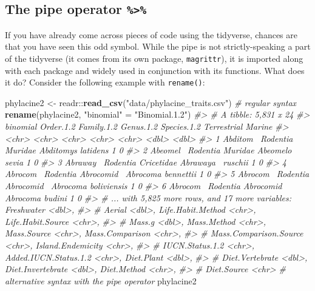 \documentclass[]{book}
\newenvironment{Shaded}{}{}
\newcommand{\CommentTok}[1]{\textcolor[rgb]{0.38,0.63,0.69}{\textit{#1}}}
\newcommand{\KeywordTok}[1]{\textcolor[rgb]{0.00,0.44,0.13}{\textbf{#1}}}
\newcommand{\NormalTok}[1]{#1}
\newcommand{\OperatorTok}[1]{\textcolor[rgb]{0.40,0.40,0.40}{#1}}
\newcommand{\StringTok}[1]{\textcolor[rgb]{0.25,0.44,0.63}{#1}}
\begin{document}
\hypertarget{the-pipe-operator}{%
\subsection{\texorpdfstring{The pipe operator \texttt{\%\textgreater{}\%}}{The pipe operator \%\textgreater{}\%}}\label{the-pipe-operator}}

If you have already come across pieces of code using the tidyverse, chances are
that you have seen this odd symbol. While the pipe is not strictly-speaking a
part of the tidyverse (it comes from its own package, \texttt{magrittr}), it is
imported along with each package and widely used in conjunction with its
functions.
What does it do? Consider the following example with \texttt{rename()}:

\begin{Shaded}
\begin{Highlighting}[]
\NormalTok{phylacine2 <-}\StringTok{ }\NormalTok{readr}\OperatorTok{::}\KeywordTok{read_csv}\NormalTok{(}\StringTok{"data/phylacine_traits.csv"}\NormalTok{)}
\CommentTok{# regular syntax}
\KeywordTok{rename}\NormalTok{(phylacine2, }\StringTok{"binomial"}\NormalTok{ =}\StringTok{ "Binomial.1.2"}\NormalTok{)}
\CommentTok{#> # A tibble: 5,831 x 24}
\CommentTok{#>   binomial Order.1.2 Family.1.2 Genus.1.2 Species.1.2 Terrestrial Marine}
\CommentTok{#>   <chr>    <chr>     <chr>      <chr>     <chr>             <dbl>  <dbl>}
\CommentTok{#> 1 Abditom~ Rodentia  Muridae    Abditomys latidens              1      0}
\CommentTok{#> 2 Abeomel~ Rodentia  Muridae    Abeomelo~ sevia                 1      0}
\CommentTok{#> 3 Abraway~ Rodentia  Cricetidae Abrawaya~ ruschii               1      0}
\CommentTok{#> 4 Abrocom~ Rodentia  Abrocomid~ Abrocoma  bennettii             1      0}
\CommentTok{#> 5 Abrocom~ Rodentia  Abrocomid~ Abrocoma  boliviensis           1      0}
\CommentTok{#> 6 Abrocom~ Rodentia  Abrocomid~ Abrocoma  budini                1      0}
\CommentTok{#> # ... with 5,825 more rows, and 17 more variables: Freshwater <dbl>,}
\CommentTok{#> #   Aerial <dbl>, Life.Habit.Method <chr>, Life.Habit.Source <chr>,}
\CommentTok{#> #   Mass.g <dbl>, Mass.Method <chr>, Mass.Source <chr>, Mass.Comparison <chr>,}
\CommentTok{#> #   Mass.Comparison.Source <chr>, Island.Endemicity <chr>,}
\CommentTok{#> #   IUCN.Status.1.2 <chr>, Added.IUCN.Status.1.2 <chr>, Diet.Plant <dbl>,}
\CommentTok{#> #   Diet.Vertebrate <dbl>, Diet.Invertebrate <dbl>, Diet.Method <chr>,}
\CommentTok{#> #   Diet.Source <chr>}
\CommentTok{# alternative syntax with the pipe operator}
\NormalTok{phylacine2 }\OperatorTok{%
}
\end{Highlighting}
\end{Shaded}
\end{document}
